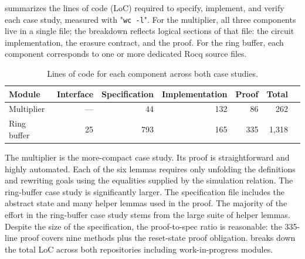 \documentclass[fontset=fira-newtxsf]{mitthesis}
\theoremstyle{definition}
\theoremstyle{plain}
\begin{document}
 summarizes the lines of code (LoC) required to specify, implement, and verify each case study, measured with "\texttt{wc -l}".
For the multiplier, all three components live in a single file; the breakdown reflects logical sections of that file: the circuit implementation, the erasure contract, and the proof.
For the ring buffer, each component corresponds to one or more dedicated Rocq source files.

\begin{table}[h]
\centering
\begin{tabular}{lrrrrrr}
\toprule
\textbf{Module} & \textbf{Interface} & \textbf{Specification} & \textbf{Implementation} & \textbf{Proof} & \textbf{Total}
\\\midrule
Multiplier       & ---  &  44  & 132  &  86  &   262 \\
Ring buffer      &  25  & 793  & 165  & 335  & 1{,}318 \\
\bottomrule
\end{tabular}
\smallskip

\caption[Case studies (LoC)]{Lines of code for each component across both case studies.}
\label{tab:loc}
\end{table}

The multiplier is the more-compact case study.
Its proof is straightforward and highly automated.
Each of the six lemmas requires only unfolding the definitions and rewriting goals using the equalities supplied by the simulation relation.
The ring-buffer case study is significantly larger.
The specification file includes the abstract state and many helper lemmas used in the proof.
The majority of the effort in the ring-buffer case study stems from the large suite of helper lemmas.
Despite the size of the specification, the proof-to-spec ratio is reasonable: the 335-line proof covers nine methods plus the reset-state proof obligation.
 breaks down the total LoC across both repositories including work-in-progress modules.
\end{document}
